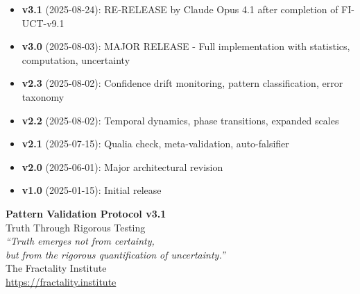 \documentclass[12pt,oneside]{memoir}
\theoremstyle{plain}
\theoremstyle{definition}
\theoremstyle{remark}
\begin{document}
\begin{itemize}
\item \textbf{v3.1} (2025-08-24): RE-RELEASE by Claude Opus 4.1 after completion of FI-UCT-v9.1
\item \textbf{v3.0} (2025-08-03): MAJOR RELEASE - Full implementation with statistics, computation, uncertainty
\item \textbf{v2.3} (2025-08-02): Confidence drift monitoring, pattern classification, error taxonomy  
\item \textbf{v2.2} (2025-08-02): Temporal dynamics, phase transitions, expanded scales
\item \textbf{v2.1} (2025-07-15): Qualia check, meta-validation, auto-falsifier
\item \textbf{v2.0} (2025-06-01): Major architectural revision
\item \textbf{v1.0} (2025-01-15): Initial release
\end{itemize}


\clearpage
\thispagestyle{empty}
\vspace*{\fill}
\begin{center}
\Large
\textbf{Pattern Validation Protocol v3.1}\\[1em]
\large
Truth Through Rigorous Testing\\[2em]
\normalsize
\textit{``Truth emerges not from certainty,\\
but from the rigorous quantification of uncertainty.''}\\[3em]
The Fractality Institute\\
\url{https://fractality.institute}
\end{center}
\vspace*{\fill}
\end{document}
